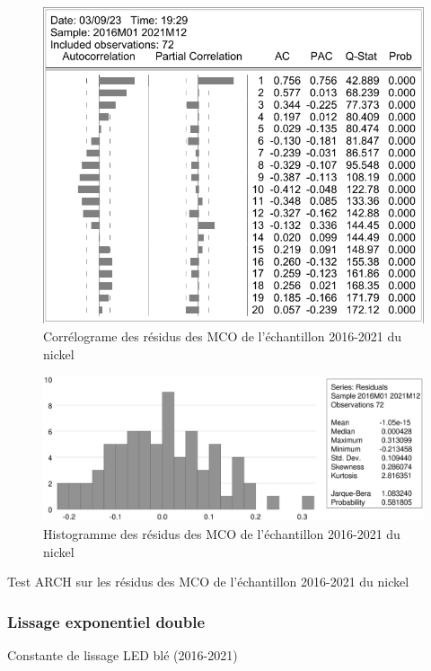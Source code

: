 \documentclass[12pt,a4paper]{article}
\begin{document}
\begin{figure}[H]
    \centering
    \includegraphics[]{annexe/3_2_mco_corr_nickel.pdf}
    \caption{Corrélograme des résidus des MCO de l'échantillon 2016-2021 du nickel}
    \label{fig:mco_cor_nickel21}
\end{figure}

\begin{figure}[H]
    \centering
    \includegraphics[width=\textwidth]{annexe/3_2_mco_hist_nickel.eps}
    \caption{Histogramme des résidus des MCO de l'échantillon 2016-2021 du nickel}
    \label{fig:mco_hist_nickel21}
\end{figure}

\begin{table}[H]
    \centering
    \caption{Test ARCH sur les résidus des MCO de l'échantillon 2016-2021 du nickel}
    \label{tab:mco_homo_nickel19}
    \sffamily
    
\end{table}

\subsubsection{Lissage exponentiel double}\label{appendix:led_21}
\begin{table}[H]
    \centering
    \caption{Constante de lissage LED blé (2016-2021)}
    \label{tab:led_ble21}
    \sffamily
    
\end{table}
\end{document}
